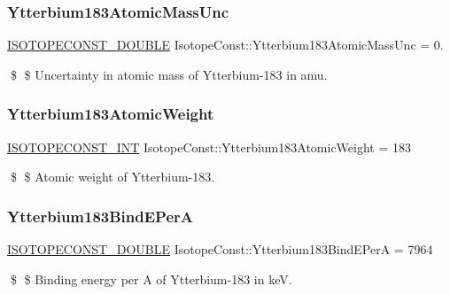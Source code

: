 \subsubsection{\texorpdfstring{Ytterbium183\+Atomic\+Mass\+Unc}{Ytterbium183AtomicMassUnc}}
{\footnotesize\ttfamily \mbox{\hyperlink{group___isotope_const-_macros_ga8f45a7272ce02c0b4c65c44636ed719a}{I\+S\+O\+T\+O\+P\+E\+C\+O\+N\+S\+T\+\_\+\+D\+O\+U\+B\+LE}} Isotope\+Const\+::\+Ytterbium183\+Atomic\+Mass\+Unc = 0.}

\$ \$ Uncertainty in atomic mass of Ytterbium-\/183 in amu. \mbox{\label{group___isotope_const-_ytterbium-_yb183_gabed65fff693d87d604ae75bef7015bd2}} 
\subsubsection{\texorpdfstring{Ytterbium183\+Atomic\+Weight}{Ytterbium183AtomicWeight}}
{\footnotesize\ttfamily \mbox{\hyperlink{group___isotope_const-_macros_ga5f18360b3e99483a35c32d789e62621c}{I\+S\+O\+T\+O\+P\+E\+C\+O\+N\+S\+T\+\_\+\+I\+NT}} Isotope\+Const\+::\+Ytterbium183\+Atomic\+Weight = 183}

\$ \$ Atomic weight of Ytterbium-\/183. \mbox{\label{group___isotope_const-_ytterbium-_yb183_ga18dcfa6299ffe1a97eec1048f64181de}} 
\subsubsection{\texorpdfstring{Ytterbium183\+Bind\+E\+PerA}{Ytterbium183BindEPerA}}
{\footnotesize\ttfamily \mbox{\hyperlink{group___isotope_const-_macros_ga8f45a7272ce02c0b4c65c44636ed719a}{I\+S\+O\+T\+O\+P\+E\+C\+O\+N\+S\+T\+\_\+\+D\+O\+U\+B\+LE}} Isotope\+Const\+::\+Ytterbium183\+Bind\+E\+PerA = 7964}

\$ \$ Binding energy per A of Ytterbium-\/183 in keV. \mbox{\label{group___isotope_const-_ytterbium-_yb183_gab97a0e298435ef2ab23cb442ef2ff9bc}} 
